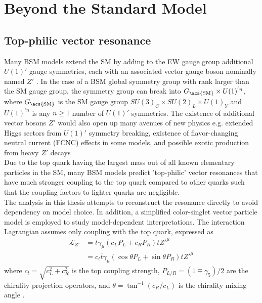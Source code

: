 \documentclass[../thesis.tex]{subfiles}
\begin{document}
\section{Beyond the Standard Model}
\subsection{Top-philic vector resonance}
Many BSM models extend the \acs{SM} by adding to the \acs{EW} gauge group additional $U(1)'$ gauge symmetries, each with an associated vector gauge boson nominally named $Z'$ \citep{theory:Zp}. In the case of a \acs{BSM} global symmetry group with rank larger than the \acs{SM} gauge group, the symmetry group can break into $G_\text{\acs{SM}}\times U(1)^{'n}$, where $G_\text{\acs{SM}}$ is the \acs{SM} gauge group $SU(3)_C \times SU(2)_L \times U(1)_Y$ and $U(1)^{'n}$ is any $n\geq 1$ number of $U(1)'$ symmetries. The existence of additional vector bosons $Z'$ would also open up many avenues of new physics e.g. extended Higgs sectors from $U(1)'$ symmetry breaking, existence of flavor-changing neutral current (FCNC) effects in some models, and possible exotic production from heavy $Z'$ decays \citep{theory:Zp}\\
Due to the top quark having the largest mass out of all known elementary particles in the \acs{SM}, many \acs{BSM} models \citep{Ferretti:2013kya,Vecchi:2015fma,Agashe:2003zs,Agashe:2004rs} predict 'top-philic' vector resonances that have much stronger coupling to the top quark compared to other quarks such that the coupling factors to lighter quarks are negligible.\\
The analysis in this thesis attempts to reconstruct the resonance directly to avoid dependency on model choice. In addition, a simplified color-singlet vector particle model \citep{theory:ttZp,theory:ttZp_LHC} is employed to study model-dependent interpretations. The interaction Lagrangian assumes only coupling with the top quark, expressed as
\begin{equation}
\begin{aligned}
\mathcal{L}_{Z'} &= \bar{t}\gamma_\mu\left(c_L P_L + c_R P_R\right) tZ'^{\mu}\\
&= c_t \bar{t}\gamma_\mu\left(\cos\theta P_L + \sin\theta P_R\right) tZ'^{\mu}
\end{aligned}
\end{equation}
where $c_t=\sqrt{c_L^2+c_R^2}$ is the top coupling strength, $P_{L/R}=(1\mp \gamma_5)/2$ are the chirality projection operators, and $\theta = \tan^{-1}(c_R/c_L)$ is the chirality mixing angle \citep{theory:ttZp}.\\
\end{document}
